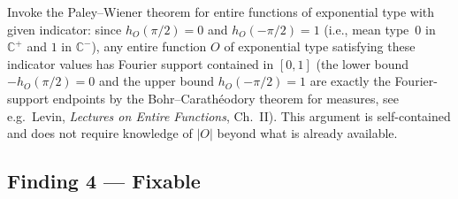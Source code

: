 \documentclass[11pt]{article}
\newcommand{\C}{\mathbb{C}}
\begin{document}
\begin{description}[leftmargin=0pt]
\item[What would establish it:]
Invoke the Paley--Wiener theorem for entire functions of exponential type with
given indicator: since $h_O(\pi/2)=0$ and $h_O(-\pi/2)=1$ (i.e., mean type~$0$ in
$\C^+$ and $1$ in $\C^-$), any entire function $O$ of exponential type satisfying
these indicator values has Fourier support contained in $[0,1]$
(the lower bound $-h_O(\pi/2)=0$ and the upper bound $h_O(-\pi/2)=1$
are exactly the Fourier-support endpoints by the Bohr--Carath\'{e}odory theorem
for measures, see e.g.\ Levin, \emph{Lectures on Entire Functions}, Ch.~II).
This argument is self-contained and does not require knowledge of $|O|$
beyond what is already available.
\end{description}

\subsection*{Finding 4 — Fixable}
\end{document}
